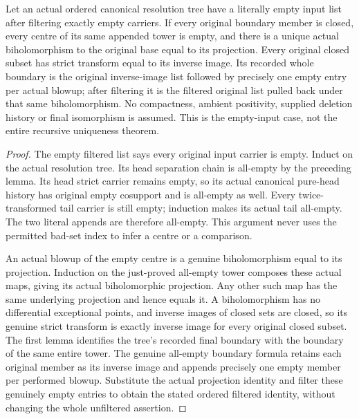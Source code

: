\begin{theorem}
\label{hir:original-empty-filtered-parts-tree-projection-neutrality}
\leanok
Let an actual ordered canonical resolution tree have a literally empty
input list after filtering exactly empty carriers. If every original
boundary member is closed, every centre of its same appended tower is
empty, and there is a unique actual biholomorphism to the original base
equal to its projection. Every original closed subset has strict
transform equal to its inverse image. Its recorded whole boundary is
the original inverse-image list followed by precisely one empty entry
per actual blowup; after filtering it is the filtered original list
pulled back under that same biholomorphism. No compactness, ambient
positivity, supplied deletion history or final isomorphism is assumed.
This is the empty-input case, not the entire recursive uniqueness theorem.
\end{theorem}
\begin{proof}
The empty filtered list says every original input carrier is empty.
Induct on the actual resolution tree. Its head separation chain is
all-empty by the preceding lemma. Its head strict carrier remains
empty, so its actual canonical pure-head history has original empty
cosupport and is all-empty as well. Every twice-transformed tail carrier
is still empty; induction makes its actual tail all-empty. The two
literal appends are therefore all-empty. This argument never uses the
permitted bad-set index to infer a centre or a comparison.

An actual blowup of the empty centre is a genuine biholomorphism equal
to its projection. Induction on the just-proved all-empty tower composes
these actual maps, giving its actual biholomorphic projection. Any other
such map has the same underlying projection and hence equals it. A
biholomorphism has no differential exceptional points, and inverse
images of closed sets are closed, so its genuine strict transform is
exactly inverse image for every original closed subset. The first lemma
identifies the tree's recorded final boundary with the boundary of the
same entire tower. The genuine all-empty boundary formula retains each
original member as its inverse image and appends precisely one empty
member per performed blowup. Substitute the actual projection identity
and filter these genuinely empty entries to obtain the stated ordered
filtered identity, without changing the whole unfiltered assertion.
\end{proof}
